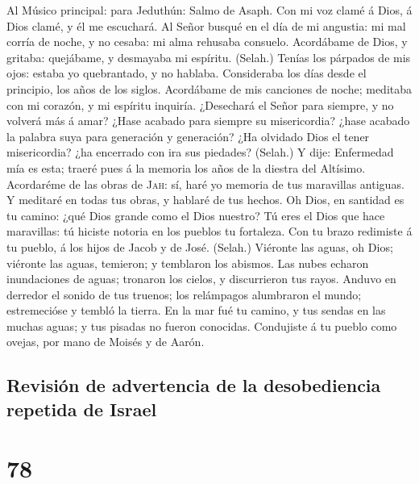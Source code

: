  Al Músico principal: para Jeduthún: Salmo de Asaph. Con
mi voz clamé á Dios, á Dios clamé, y él me escuchará.  Al
Señor busqué en el día de mi angustia: mi mal corría de noche, y no
cesaba: mi alma rehusaba consuelo.  Acordábame de Dios, y
gritaba: quejábame, y desmayaba mi espíritu. (Selah.) 
Tenías los párpados de mis ojos: estaba yo quebrantado, y no hablaba.
 Consideraba los días desde el principio, los años de los
siglos.  Acordábame de mis canciones de noche; meditaba
con mi corazón, y mi espíritu inquiría.  ¿Desechará el
Señor para siempre, y no volverá más á amar?  ¿Hase
acabado para siempre su misericordia? ¿hase acabado la palabra suya para
generación y generación?  ¿Ha olvidado Dios el tener
misericordia? ¿ha encerrado con ira sus piedades? (Selah.)
 Y dije: Enfermedad mía es esta; traeré pues á la memoria
los años de la diestra del Altísimo.  Acordaréme de las
obras de \textsc{Jah}: sí, haré yo memoria de tus maravillas antiguas.
 Y meditaré en todas tus obras, y hablaré de tus hechos.
 Oh Dios, en santidad es tu camino: ¿qué Dios grande como
el Dios nuestro?  Tú eres el Dios que hace maravillas: tú
hiciste notoria en los pueblos tu fortaleza.  Con tu
brazo redimiste á tu pueblo, á los hijos de Jacob y de José. (Selah.)
 Viéronte las aguas, oh Dios; viéronte las aguas,
temieron; y temblaron los abismos.  Las nubes echaron
inundaciones de aguas; tronaron los cielos, y discurrieron tus rayos.
 Anduvo en derredor el sonido de tus truenos; los
relámpagos alumbraron el mundo; estremecióse y tembló la tierra.
 En la mar fué tu camino, y tus sendas en las muchas
aguas; y tus pisadas no fueron conocidas.  Condujiste á
tu pueblo como ovejas, por mano de Moisés y de Aarón.

\hypertarget{revisiuxf3n-de-advertencia-de-la-desobediencia-repetida-de-israel}{%
\subsection{Revisión de advertencia de la desobediencia repetida de
Israel}\label{revisiuxf3n-de-advertencia-de-la-desobediencia-repetida-de-israel}}

\hypertarget{section-77}{%
\section{78}\label{section-77}}

